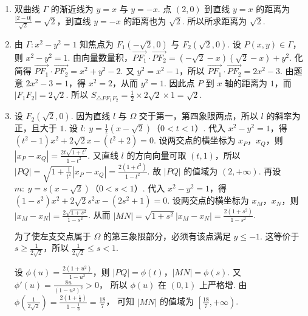 \begin{solution}
\begin{enumerate}
\item 双曲线 \( \Gamma \) 的渐近线为 \( y=x \) 与 \( y=-x \).
点 \( \left( 2,0 \right) \) 到直线 \( y=x \) 的距离为 \( \frac{\left| 2-0 \right|}{\sqrt{2}}=\sqrt{2} \)，到直线 \( y=-x \) 的距离也为 \( \sqrt{2} \). 所以所求距离为 \( \sqrt{2} \).

\item 由 \( \Gamma:x^2-y^2=1 \) 知焦点为 \( F_1\left( -\sqrt{2},0 \right) \) 与 \( F_2\left( \sqrt{2},0 \right) \).
设 \( P\left( x,y \right)\in \Gamma \)，则 \( x^2-y^2=1 \).
由向量数量积，\( \overrightarrow{PF_1}\cdot \overrightarrow{PF_2}=\left( -\sqrt{2}-x \right)\left( \sqrt{2}-x \right)+y^2 \). 化简得 \( \overrightarrow{PF_1}\cdot \overrightarrow{PF_2}=x^2+y^2-2 \). 又 \( y^2=x^2-1 \)，所以 \( \overrightarrow{PF_1}\cdot \overrightarrow{PF_2}=2x^2-3 \).
由题意 \( 2x^2-3=1 \)，得 \( x^2=2 \)，从而 \( y^2=1 \). 因此点 \(P\) 到 \( x \) 轴的距离为 \( 1 \)，而 \( \left| F_1F_2 \right|=2\sqrt{2} \). 所以 \( S_{\triangle PF_1F_2}=\frac{1}{2}\times 2\sqrt{2}\times 1=\sqrt{2} \).

\item 设 \( F_2\left( \sqrt{2},0 \right) \).
因为直线 \( l \) 与 \( \Omega \) 交于第一，第四象限两点，所以 \( l \) 的斜率为正，且大于 \( 1 \). 设 \( l:\ y=\frac{1}{t}\left( x-\sqrt{2} \right) \)（\( 0<t<1 \)）. 代入 \( x^2-y^2=1 \)，得 \( \left( t^2-1 \right)x^2+2\sqrt{2}x-\left( t^2+2 \right)=0 \). 设两交点的横坐标为 \( x_P \)，\( x_Q \)，则 \( \left| x_P-x_Q \right|=\frac{2t\sqrt{1+t^2}}{1-t^2} \). 又直线 \( l \) 的方向向量可取 \( \left( t,1 \right) \)，所以 \( \left| PQ \right|=\sqrt{1+\frac{1}{t^2}}\left| x_P-x_Q \right|=\frac{2\left( 1+t^2 \right)}{1-t^2} \).
故 \( \left| PQ \right| \) 的值域为 \( \left( 2,+\infty \right) \).
再设 \( m:\ y=s\left( x-\sqrt{2} \right) \)（\( 0<s<1 \)）. 代入 \( x^2-y^2=1 \)，得 \( \left( 1-s^2 \right)x^2+2\sqrt{2}s^2x-\left( 2s^2+1 \right)=0 \). 设两交点的横坐标为 \( x_M \)，\( x_N \)，则 \( \left| x_M-x_N \right|=\frac{2\sqrt{1+s^2}}{1-s^2} \). 从而 \( \left| MN \right|=\sqrt{1+s^2}\left| x_M-x_N \right|=\frac{2\left( 1+s^2 \right)}{1-s^2} \).

为了使左支交点属于 \( \Omega \) 的第三象限部分，必须有该点满足 \( y\le -1 \). 这等价于 \( s\ge \frac{1}{2\sqrt{2}} \)，所以 \( \frac{1}{2\sqrt{2}}\le s<1 \).

设 \( \phi(u)=\frac{2\left( 1+u^2 \right)}{1-u^2} \)，则 \( \left| PQ \right|=\phi(t) \)，\( \left| MN \right|=\phi(s) \). 又 \( \phi'(u)=\frac{8u}{\left( 1-u^2 \right)^2}>0 \)，
所以 \( \phi(u) \) 在 \( \left( 0,1 \right) \) 上严格增.
由 \( \phi\left( \frac{1}{2\sqrt{2}} \right)=\frac{2\left( 1+\frac{1}{8} \right)}{1-\frac{1}{8}}=\frac{18}{7} \)，
可知 \( \left| MN \right| \) 的值域为 \( \left[ \frac{18}{7},+\infty \right) \).


\end{enumerate}
\end{solution}
